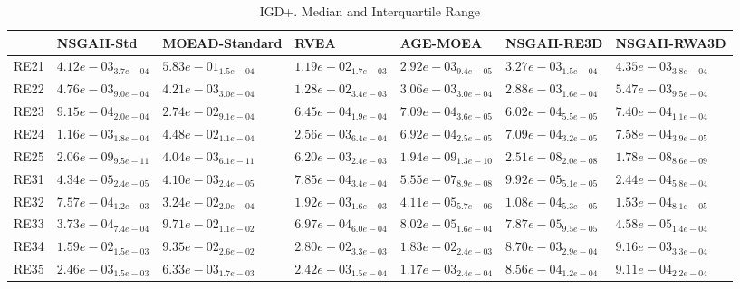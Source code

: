 \documentclass{article}
\begin{document}
\begin{table}
\caption{IGD+. Median and Interquartile Range}
\label{table: IGD+}
\centering
\begin{scriptsize}
\begin{tabular}{lllllll}
\hline & NSGAII-Std & MOEAD-Standard & RVEA & AGE-MOEA & NSGAII-RE3D &  NSGAII-RWA3D\\
\hline 
RE21 & $  4.12e-03_{ 3.7e-04}$ & $  5.83e-01_{ 1.5e-04}$ & $  1.19e-02_{ 1.7e-03}$ & \cellcolor{gray95}$  2.92e-03_{ 9.4e-05}$ & \cellcolor{gray25}$  3.27e-03_{ 1.5e-04}$ & $  4.35e-03_{ 3.8e-04}$ \\
RE22 & $  4.76e-03_{ 9.0e-04}$ & $  4.21e-03_{ 3.0e-04}$ & $  1.28e-02_{ 3.4e-03}$ & \cellcolor{gray25}$  3.06e-03_{ 3.0e-04}$ & \cellcolor{gray95}$  2.88e-03_{ 1.6e-04}$ & $  5.47e-03_{ 9.5e-04}$ \\
RE23 & $  9.15e-04_{ 2.0e-04}$ & $  2.74e-02_{ 9.1e-04}$ & \cellcolor{gray25}$  6.45e-04_{ 1.9e-04}$ & $  7.09e-04_{ 3.6e-05}$ & \cellcolor{gray95}$  6.02e-04_{ 5.5e-05}$ & $  7.40e-04_{ 1.1e-04}$ \\
RE24 & $  1.16e-03_{ 1.8e-04}$ & $  4.48e-02_{ 1.1e-04}$ & $  2.56e-03_{ 6.4e-04}$ & \cellcolor{gray95}$  6.92e-04_{ 2.5e-05}$ & \cellcolor{gray25}$  7.09e-04_{ 3.2e-05}$ & $  7.58e-04_{ 3.9e-05}$ \\
RE25 & \cellcolor{gray25}$  2.06e-09_{ 9.5e-11}$ & $  4.04e-03_{ 6.1e-11}$ & $  6.20e-03_{ 2.4e-03}$ & \cellcolor{gray95}$  1.94e-09_{ 1.3e-10}$ & $  2.51e-08_{ 2.0e-08}$ & $  1.78e-08_{ 8.6e-09}$ \\
RE31 & \cellcolor{gray25}$  4.34e-05_{ 2.4e-05}$ & $  4.10e-03_{ 2.4e-05}$ & $  7.85e-04_{ 3.4e-04}$ & \cellcolor{gray95}$  5.55e-07_{ 8.9e-08}$ & $  9.92e-05_{ 5.1e-05}$ & $  2.44e-04_{ 5.8e-04}$ \\
RE32 & $  7.57e-04_{ 1.2e-03}$ & $  3.24e-02_{ 2.0e-04}$ & $  1.92e-03_{ 1.6e-03}$ & \cellcolor{gray95}$  4.11e-05_{ 5.7e-06}$ & \cellcolor{gray25}$  1.08e-04_{ 5.3e-05}$ & $  1.53e-04_{ 8.1e-05}$ \\
RE33 & $  3.73e-04_{ 7.4e-04}$ & $  9.71e-02_{ 1.1e-02}$ & $  6.97e-04_{ 6.0e-04}$ & $  8.02e-05_{ 1.6e-04}$ & \cellcolor{gray25}$  7.87e-05_{ 9.5e-05}$ & \cellcolor{gray95}$  4.58e-05_{ 1.4e-04}$ \\
RE34 & $  1.59e-02_{ 1.5e-03}$ & $  9.35e-02_{ 2.6e-02}$ & $  2.80e-02_{ 3.3e-03}$ & $  1.83e-02_{ 2.4e-03}$ & \cellcolor{gray95}$  8.70e-03_{ 2.9e-04}$ & \cellcolor{gray25}$  9.16e-03_{ 3.3e-04}$ \\
RE35 & $  2.46e-03_{ 1.5e-03}$ & $  6.33e-03_{ 1.7e-03}$ & $  2.42e-03_{ 1.5e-04}$ & $  1.17e-03_{ 2.4e-04}$ & \cellcolor{gray95}$  8.56e-04_{ 1.2e-04}$ & \cellcolor{gray25}$  9.11e-04_{ 2.2e-04}$ \\

\end{tabular}
\end{scriptsize}
\end{table}
\end{document}
